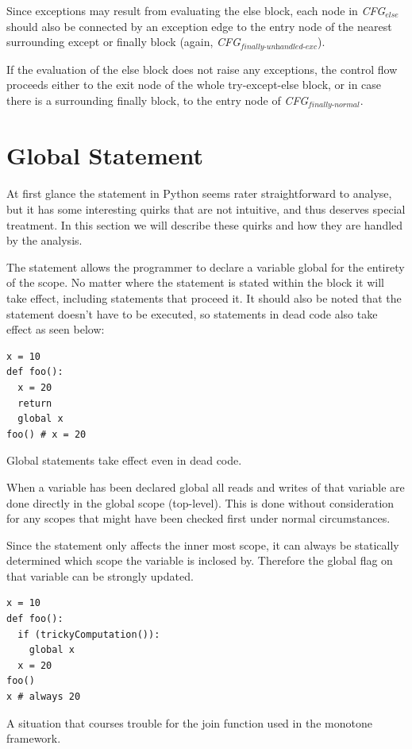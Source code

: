 Since exceptions may result from evaluating the else block, each node in \textit{CFG$_{\textit{else}}$} should also be connected by an exception edge to the entry node of the nearest surrounding except or finally block (again, \textit{CFG$_{\textit{finally-unhandled-exc}}$}).

If the evaluation of the else block does not raise any exceptions, the control flow proceeds either to the exit node of the whole try-except-else block, or in case there is a surrounding finally block, to the entry node of \textit{CFG$_{\textit{finally-normal}}$}.



\section{Global Statement}
At first glance the  statement in Python seems rater straightforward to analyse, but it has some interesting quirks that are not intuitive, and thus deserves special treatment. In this section we will describe these quirks and how they are handled by the analysis.

The statement allows the programmer to declare a variable global for the entirety of the scope. No matter where the  statement is stated within the block it will take effect, including statements that proceed it. It should also be noted that the statement doesn't have to be executed, so  statements in dead code also take effect as seen below:

\begin{listing}[H]
  \begin{verbatim}
x = 10
def foo():
  x = 20
  return
  global x
foo() # x = 20
  \end{verbatim}
  \caption{Global statements take effect even in dead code.}
\end{listing}

When a variable has been declared global all reads and writes of that variable are done directly in the global scope (top-level). This is done without consideration for any scopes that might have been checked first under normal circumstances.

Since the  statement only affects the inner most scope, it can always be statically determined which scope the variable is inclosed by. Therefore the global flag on that variable can be strongly updated.

\begin{listing}[H]
  \begin{verbatim}
x = 10
def foo():
  if (trickyComputation()):
    global x
  x = 20
foo()
x # always 20
  \end{verbatim}
  \caption{A situation that courses trouble for the join function used in the monotone framework.}
\end{listing}

